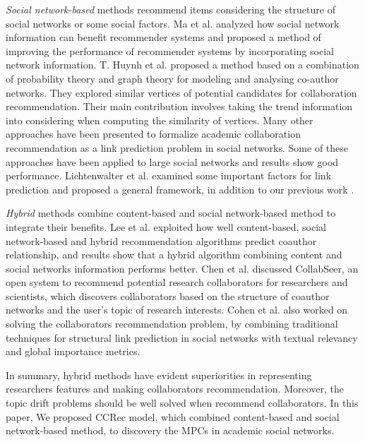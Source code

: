 \emph{Social network-based} methods recommend items considering the structure of social networks or some social factors. Ma et al. \cite{ma2011recommender} analyzed how social network information can benefit recommender systems and proposed a method of improving the performance of recommender systems by incorporating social network information. T. Huynh et al. \cite{huynh2013trend} proposed a method based on a combination of probability theory and graph theory for modeling and analysing co-author networks. They explored similar vertices of potential candidates for collaboration recommendation. Their main contribution involves taking the trend information into considering when computing the similarity of vertices. Many other approaches have been presented to formalize academic collaboration recommendation as a link prediction problem \cite{chen2012discovering} \cite{sun2011co} in social networks. Some of these approaches have been applied to large social networks and results show good performance. Lichtenwalter et al. \cite{lichtenwalter2010new} examined some important factors for link prediction and proposed a general framework, in addition to our previous work \cite{li2014acrec}.

\emph{Hybrid} methods combine content-based and social network-based method to integrate their benefits. Lee et al. \cite{lee2011recommending} exploited how well content-based, social network-based and hybrid recommendation algorithms predict coauthor relationship, and results show that a hybrid algorithm combining content and social networks information performs better. Chen et al. \cite{chen2011collabseer} discussed CollabSeer, an open system to recommend potential research collaborators for researchers and scientists, which discovers collaborators based on the structure of coauthor networks and the user's topic of research interests. Cohen et al. \cite{cohen2013recommending} also worked on solving the collaborators recommendation problem, by combining traditional techniques for structural link prediction in social networks with textual relevancy and global importance metrics.

In summary, hybrid methods have evident superiorities in representing researchers features and making collaborators recommendation. Moreover, the topic drift problems should be well solved when recommend collaborators. In this paper, We proposed CCRec model, which combined content-based and social network-based method, to discovery the MPCs in academic social networks.


